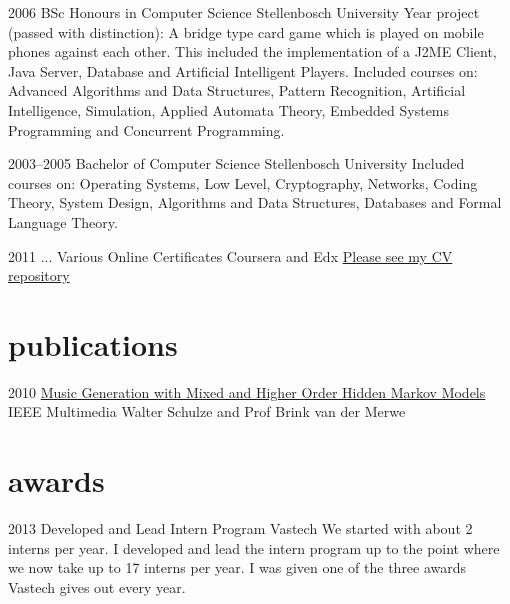 \documentclass[print]{friggeri-cv} %
\begin{document}
\begin{entrylist}

\entry
{2006}
{BSc Honours {\normalfont in Computer Science}}
{Stellenbosch University}
{Year project (passed with distinction): A bridge type card game which is played on mobile phones against each other. This included the implementation of a J2ME Client, Java Server, Database and Artificial Intelligent Players.
Included courses on: Advanced Algorithms and Data Structures, Pattern Recognition, Artificial Intelligence, Simulation, Applied Automata Theory, Embedded Systems Programming and Concurrent Programming.}

\entry
{2003--2005}
{Bachelor {\normalfont of Computer Science}}
{Stellenbosch University}
{Included courses on: Operating Systems, Low Level, Cryptography, Networks, Coding Theory, System Design, Algorithms and Data Structures, Databases and Formal Language Theory.}

\entry
{2011 ...}
{Various Online Certificates}
{Coursera and Edx}
{\href{https://github.com/awalterschulze/waltercv}{Please see my CV repository}}

\end{entrylist}

\section{publications}


\begin{entrylist}

\entry
{2010}
{\href{http://doi.ieeecomputersociety.org/10.1109/MMUL.2010.44}{Music Generation with Mixed and Higher Order Hidden Markov Models}}
{IEEE Multimedia}
{Walter Schulze and Prof Brink van der Merwe}

\end{entrylist}

\newpage

\section{awards}

\begin{entrylist}

\entry
{2013}
{Developed and Lead Intern Program}
{Vastech}
{We started with about 2 interns per year. I developed and lead the intern program up to the point where we now take up to 17 interns per year.  I was given one of the three awards Vastech gives out every year.}

\end{entrylist}
\end{document}
